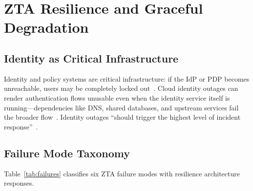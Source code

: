 \documentclass[sigconf,nonacm]{acmart}
\begin{document}
\section{ZTA Resilience and Graceful Degradation}

\subsection{Identity as Critical Infrastructure}

Identity and policy systems are critical infrastructure: if the IdP
or PDP becomes unreachable, users may be completely locked
out~\cite{hackernews2024}.  Cloud identity outages can render
authentication flows unusable even when the identity service itself
is running---dependencies like DNS, shared databases, and upstream
services fail the broader flow~\cite{hackernews2024}.  Identity outages
``should trigger the highest level of incident
response''~\cite{hackernews2024}.

\subsection{Failure Mode Taxonomy}

Table~\ref{tab:failures} classifies six ZTA failure modes with
resilience architecture responses.
\end{document}

